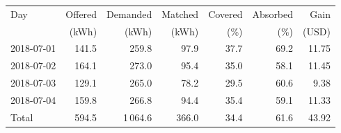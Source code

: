 \begin{tabular}{lrrrrrr}
\toprule
Day & Offered & Demanded & Matched & Covered & Absorbed & Gain \\
 & (kWh) & (kWh) & (kWh) & (\%) & (\%) & (USD) \\
\midrule
2018-07-01 & 141.5 & 259.8 & 97.9 & 37.7 & 69.2 & 11.75 \\
2018-07-02 & 164.1 & 273.0 & 95.4 & 35.0 & 58.1 & 11.45 \\
2018-07-03 & 129.1 & 265.0 & 78.2 & 29.5 & 60.6 & 9.38 \\
2018-07-04 & 159.8 & 266.8 & 94.4 & 35.4 & 59.1 & 11.33 \\
\midrule
Total & 594.5 & 1\,064.6 & 366.0 & 34.4 & 61.6 & 43.92 \\
\bottomrule
\end{tabular}